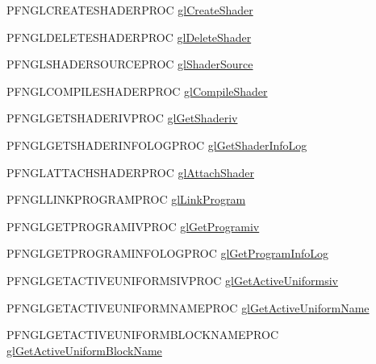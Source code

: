\begin{DoxyCompactItemize}
\item 
P\+F\+N\+G\+L\+C\+R\+E\+A\+T\+E\+S\+H\+A\+D\+E\+R\+P\+R\+O\+C \hyperlink{class_agmd_1_1_g_l_context_aad95db217bd1f361c5b0504213c2e28a}{gl\+Create\+Shader}
\item 
P\+F\+N\+G\+L\+D\+E\+L\+E\+T\+E\+S\+H\+A\+D\+E\+R\+P\+R\+O\+C \hyperlink{class_agmd_1_1_g_l_context_a612bf90eb2a4e6c81952d7c7b6768efa}{gl\+Delete\+Shader}
\item 
P\+F\+N\+G\+L\+S\+H\+A\+D\+E\+R\+S\+O\+U\+R\+C\+E\+P\+R\+O\+C \hyperlink{class_agmd_1_1_g_l_context_aec3bff756b4b3cfb6fcfed586057fb83}{gl\+Shader\+Source}
\item 
P\+F\+N\+G\+L\+C\+O\+M\+P\+I\+L\+E\+S\+H\+A\+D\+E\+R\+P\+R\+O\+C \hyperlink{class_agmd_1_1_g_l_context_aa5bb16bd813572e6c138e8225b616099}{gl\+Compile\+Shader}
\item 
P\+F\+N\+G\+L\+G\+E\+T\+S\+H\+A\+D\+E\+R\+I\+V\+P\+R\+O\+C \hyperlink{class_agmd_1_1_g_l_context_a49be197c0340ee270180a6cce5fece64}{gl\+Get\+Shaderiv}
\item 
P\+F\+N\+G\+L\+G\+E\+T\+S\+H\+A\+D\+E\+R\+I\+N\+F\+O\+L\+O\+G\+P\+R\+O\+C \hyperlink{class_agmd_1_1_g_l_context_a4edef77317b844564132fbf009540018}{gl\+Get\+Shader\+Info\+Log}
\item 
P\+F\+N\+G\+L\+A\+T\+T\+A\+C\+H\+S\+H\+A\+D\+E\+R\+P\+R\+O\+C \hyperlink{class_agmd_1_1_g_l_context_abeda7db8289e604d4f8cd8ac981d1806}{gl\+Attach\+Shader}
\item 
P\+F\+N\+G\+L\+L\+I\+N\+K\+P\+R\+O\+G\+R\+A\+M\+P\+R\+O\+C \hyperlink{class_agmd_1_1_g_l_context_a1885e9862c77afd5bc22dd707883847d}{gl\+Link\+Program}
\item 
P\+F\+N\+G\+L\+G\+E\+T\+P\+R\+O\+G\+R\+A\+M\+I\+V\+P\+R\+O\+C \hyperlink{class_agmd_1_1_g_l_context_abfd374c4d790f06d91faecb6e84db682}{gl\+Get\+Programiv}
\item 
P\+F\+N\+G\+L\+G\+E\+T\+P\+R\+O\+G\+R\+A\+M\+I\+N\+F\+O\+L\+O\+G\+P\+R\+O\+C \hyperlink{class_agmd_1_1_g_l_context_acedb3e4512a2aff4dba2a8d33d47659c}{gl\+Get\+Program\+Info\+Log}
\item 
P\+F\+N\+G\+L\+G\+E\+T\+A\+C\+T\+I\+V\+E\+U\+N\+I\+F\+O\+R\+M\+S\+I\+V\+P\+R\+O\+C \hyperlink{class_agmd_1_1_g_l_context_a25770c83e63efb2f12ac2b44d497f034}{gl\+Get\+Active\+Uniformsiv}
\item 
P\+F\+N\+G\+L\+G\+E\+T\+A\+C\+T\+I\+V\+E\+U\+N\+I\+F\+O\+R\+M\+N\+A\+M\+E\+P\+R\+O\+C \hyperlink{class_agmd_1_1_g_l_context_a021b9a22a675628bc7b096cbfb3c52f8}{gl\+Get\+Active\+Uniform\+Name}
\item 
P\+F\+N\+G\+L\+G\+E\+T\+A\+C\+T\+I\+V\+E\+U\+N\+I\+F\+O\+R\+M\+B\+L\+O\+C\+K\+N\+A\+M\+E\+P\+R\+O\+C \hyperlink{class_agmd_1_1_g_l_context_a8baa2e0b898300635dd49553473f6f3f}{gl\+Get\+Active\+Uniform\+Block\+Name}

\end{DoxyCompactItemize}
